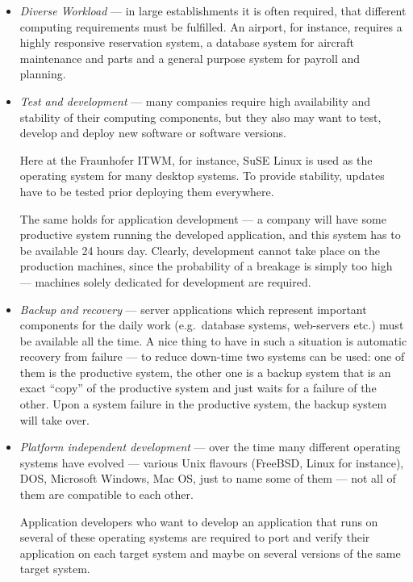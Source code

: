 \begin{itemize}
\item  \emph{Diverse Workload}  --- in  large establishments  it  is often
  required, that  different computing  requirements must be  fulfilled. An
  airport, for instance, requires  a highly responsive reservation system,
  a  database system  for aircraft  maintenance  and parts  and a  general
  purpose system for payroll and planning.
\item  \emph{Test  and  development}   ---  many  companies  require  high
  availability and stability of  their computing components, but they also
  may want to test, develop  and deploy new software or software versions.
  
  Here at  the Fraunhofer ITWM,  for instance, SuSE  Linux is used  as the
  operating system for many desktop systems. To provide stability, updates
  have to be tested prior deploying them everywhere.

  The same holds for application  development --- a company will have some
  productive system running the developed application, and this system has
  to be available 24 hours  day. Clearly, development cannot take place on
  the production machines,  since the probability of a  breakage is simply
  too high --- machines solely dedicated for development are required.
\item \emph{Backup  and recovery} --- server  applications which represent
  important  components   for  the  daily   work  (e.g.~database  systems,
  web-servers etc.) must  be available all the time. A  nice thing to have
  in such  a situation  is automatic recovery  from failure ---  to reduce
  down-time two systems can be used: one of them is the productive system,
  the  other one  is a  backup system  that is  an exact  ``copy''  of the
  productive system  and just waits  for a failure  of the other.   Upon a
  system failure  in the  productive system, the  backup system  will take
  over.
\item  \emph{Platform  independent development}  ---  over  the time  many
  different  operating  systems have  evolved  ---  various Unix  flavours
  (FreeBSD, Linux for  instance), DOS, Microsoft Windows, Mac  OS, just to
  name some of them --- not all of them are compatible to each other.

  Application developers who  want to develop an application  that runs on
  several of these operating systems are required to port and verify their
  application on each  target system and maybe on  several versions of the
  same target system.


\end{itemize}
